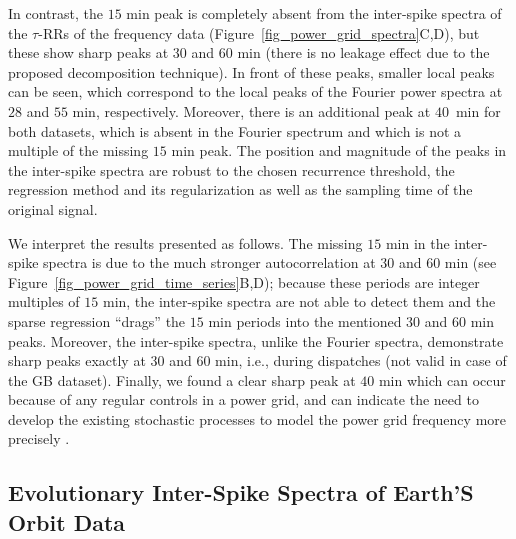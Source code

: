 \documentclass[entropy,article,accept,pdftex,moreauthors]{Definitions/mdpi}
\begin{document}
In contrast, the $15$ \si{min} peak is completely absent from the inter-spike spectra of the $\tau$-RRs of the frequency data (Figure~\ref{fig_power_grid_spectra}C,D), but these show sharp peaks 
at $30$ and $60$ \si{min} (there is no leakage effect due to the proposed decomposition technique). 
In front of these peaks, smaller local peaks can be seen, which correspond to the local peaks of the Fourier power spectra at $28$ and $55$ \si{min}, respectively.
Moreover, there is an additional peak at 
$40$~\si{min} for both datasets, which is absent in the Fourier spectrum and which is not a multiple of the missing $15$ \si{min} peak. The position and magnitude of the peaks in the 
inter-spike spectra are robust to the chosen recurrence threshold, the regression method and its regularization as well as the sampling time of the original signal.

We interpret the results presented as follows. The missing $15$ \si{min} in the inter-spike spectra is due to the much stronger autocorrelation at $30$ and $60$ \si{min} 
(see Figure~\ref{fig_power_grid_time_series}B,D); because these periods are integer multiples of $15$ \si{min}, the inter-spike spectra are not able to detect them and the 
sparse regression ``drags'' the $15$ \si{min} periods into the mentioned $30$ and $60$ \si{min} peaks. Moreover, the inter-spike spectra, unlike the Fourier spectra, demonstrate sharp peaks exactly 
at $30$ and $60$ \si{min}, i.e., during dispatches (not valid in case of the GB dataset). Finally,  we found a clear sharp peak at $40$ \si{min} which can occur 
because of any regular controls in a power grid, and can indicate the need to develop the existing stochastic processes to model the power grid frequency more precisely \cite{gorjao2020data}. 



\subsection{Evolutionary Inter-Spike Spectra of Earth'S Orbit Data}
\end{document}
